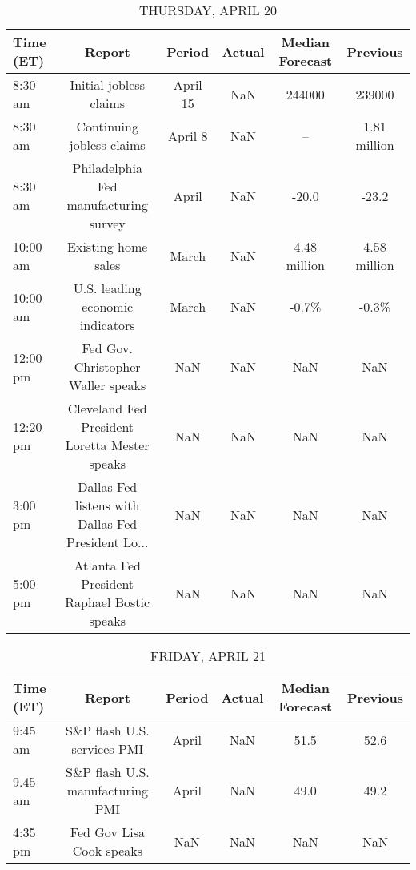 \documentclass{article}%
\begin{document}
%


\begin{table}[htbp]%
\caption{THURSDAY, APRIL 20}%
\centering%
\begin{adjustbox}{width=1\textwidth}%
\begin{tabular}{lccccc}
\toprule
Time (ET) &                                             Report &   Period & Actual & Median Forecast &     Previous \\
\midrule
  8:30 am &                             Initial jobless claims & April 15 &    NaN &          244000 &       239000 \\
  8:30 am &                          Continuing jobless claims &  April 8 &    NaN &              -- & 1.81 million \\
  8:30 am &              Philadelphia Fed manufacturing survey &    April &    NaN &           -20.0 &        -23.2 \\
 10:00 am &                                Existing home sales &    March &    NaN &    4.48 million & 4.58 million \\
 10:00 am &                   U.S. leading economic indicators &    March &    NaN &           -0.7\% &        -0.3\% \\
 12:00 pm &                 Fed Gov. Christopher Waller speaks &      NaN &    NaN &             NaN &          NaN \\
 12:20 pm &      Cleveland Fed President Loretta Mester speaks &      NaN &    NaN &             NaN &          NaN \\
  3:00 pm & Dallas Fed listens with Dallas Fed President Lo... &      NaN &    NaN &             NaN &          NaN \\
  5:00 pm &        Atlanta Fed President Raphael Bostic speaks &      NaN &    NaN &             NaN &          NaN \\
\bottomrule
\end{tabular}
%
\end{adjustbox}%
\end{table}

%


\begin{table}[htbp]%
\caption{FRIDAY, APRIL 21}%
\centering%
\begin{adjustbox}{width=1\textwidth}%
\begin{tabular}{lccccc}
\toprule
Time (ET) &                           Report & Period & Actual & Median Forecast & Previous \\
\midrule
  9:45 am &      S\&P flash U.S. services PMI &  April &    NaN &            51.5 &     52.6 \\
  9.45 am & S\&P flash U.S. manufacturing PMI &  April &    NaN &            49.0 &     49.2 \\
  4:35 pm &         Fed Gov Lisa Cook speaks &    NaN &    NaN &             NaN &      NaN \\
\bottomrule
\end{tabular}
%
\end{adjustbox}%
\end{table}
\end{document}

